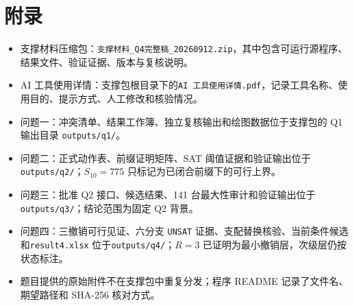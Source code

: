 \documentclass[UTF8,a4paper,zihao=-4]{ctexart}
\begin{document}
\section*{附录}
\begin{itemize}
  \item 支撑材料压缩包：\texttt{支撑材料\_Q4完整稿\_20260912.zip}，其中包含可运行源程序、结果文件、验证证据、版本与复核说明。
  \item AI 工具使用详情：支撑包根目录下的\texttt{AI 工具使用详情.pdf}，记录工具名称、使用目的、提示方式、人工修改和核验情况。
  \item 问题一：冲突清单、结果工作簿、独立复核输出和绘图数据位于支撑包的 Q1 输出目录 \texttt{outputs/q1/}。
  \item 问题二：正式动作表、前缀证明矩阵、SAT 阈值证据和验证输出位于\texttt{outputs/q2/}；\(S_{10}=775\) 只标记为已闭合前缀下的可行上界。
  \item 问题三：批准 Q2 接口、候选结果、141 台最大性审计和验证输出位于\texttt{outputs/q3/}；结论范围为固定 Q2 背景。
  \item 问题四：三撤销可行见证、六分支 \texttt{UNSAT} 证据、支配替换核验、当前条件候选和\texttt{result4.xlsx} 位于\texttt{outputs/q4/}；\(R=3\) 已证明为最小撤销层，次级层仍按状态标注。
  \item 题目提供的原始附件不在支撑包中重复分发；程序 README 记录了文件名、期望路径和 SHA-256 核对方式。
\end{itemize}
\end{document}
